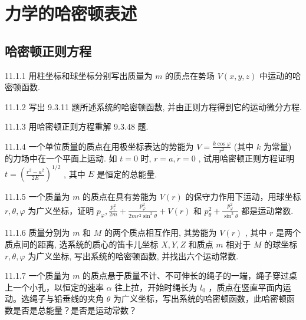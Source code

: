 \chapter{力学的哈密顿表述}

\section{哈密顿正则方程}

\begin{problem}{11.1.1}
用柱坐标和球坐标分别写出质量为 $m$ 的质点在势场 $V(x, y, z)$ 中运动的哈密顿函数.
\end{problem}
\clearpage


\begin{problem}{11.1.2}
写出 9.3.11 题所述系统的哈密顿函数, 并由正则方程得到它的运动微分方程.
\end{problem}
\clearpage


\begin{problem}{11.1.3}
用哈密顿正则方程重解 9.3.48 题.
\end{problem}
\clearpage


\begin{problem}{11.1.4}
一个单位质量的质点在用极坐标表达的势能为 $V = \frac{k\cos\varphi}{r^2}$ (其中 $k$ 为常量) 的力场中在一个平面上运动. 如 $t = 0$ 时, $r = a, \dot{r} = 0$ , 试用哈密顿正则方程证明 $t = \left(\frac{r^2 - a^2}{2E}\right)^{1/2}$ , 其中 $E$ 是恒定的总能量.
\end{problem}
\clearpage


\begin{problem}{11.1.5}
一个质量为 $m$ 的质点在具有势能为 $V(r)$ 的保守力作用下运动，用球坐标 $r, \theta, \varphi$ 为广义坐标，证明 $p_{\varphi}, \frac{p_r^2}{2m} + \frac{p_{\varphi}^2}{2mr^2\sin^2\theta} + V(r)$ 和 $p_{\theta}^2 + \frac{p_{\varphi}^2}{\sin^2\theta}$ 都是运动常数.
\end{problem}
\clearpage


\begin{problem}{11.1.6}
质量分别为 $m$ 和 $M$ 的两个质点相互作用, 其势能为 $V(r)$ , 其中 $r$ 是两个质点间的距离, 选系统的质心的笛卡儿坐标 $X, Y, Z$ 和质点 $m$ 相对于 $M$ 的球坐标 $r, \theta, \varphi$ 为广义坐标, 写出系统的哈密顿函数, 并找出六个运动常数.
\end{problem}
\clearpage


\begin{problem}{11.1.7}
一个质量为 $m$ 的质点悬于质量不计、不可伸长的绳子的一端，绳子穿过桌上一个小孔，以恒定的速率 $\alpha$ 往上拉，开始时绳长为 $l_0$ ，质点在竖直平面内运动。选绳子与铅垂线的夹角 $\theta$ 为广义坐标，写出系统的哈密顿函数，此哈密顿函数是否是总能量？是否是运动常数？
\end{problem}
\clearpage


